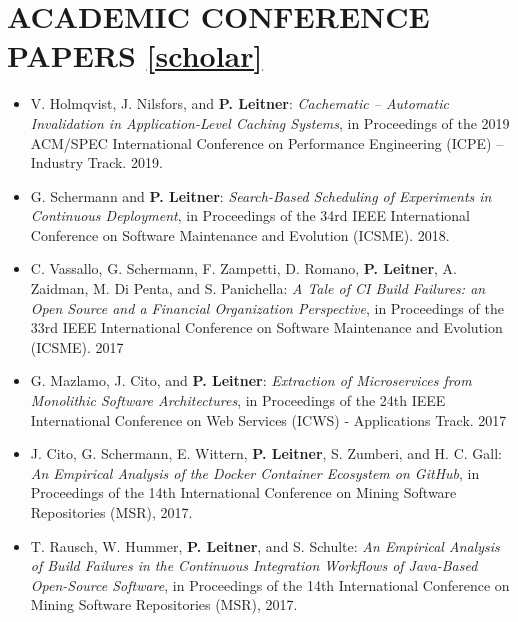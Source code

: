 \documentclass[paper=letter,fontsize=11pt]{scrartcl} %
\newcommand{\NewPart}[2]{\section*{\uppercase{#1} #2}}
\begin{document}
\NewPart{Academic Conference Papers}{\href{https://scholar.google.ch/citations?user=wZ9f8CAAAAAJ}{[scholar]}}

\begin{itemize}
	\item V. Holmqvist, J. Nilsfors, and \textbf{P. Leitner}: \emph{Cachematic -- Automatic Invalidation in Application-Level Caching Systems}, in Proceedings of the 2019 ACM/SPEC  International Conference on Performance Engineering (ICPE) -- Industry Track. 2019.
	\item G. Schermann and \textbf{P. Leitner}: \emph{Search-Based Scheduling of Experiments in Continuous Deployment}, in Proceedings of the 34rd IEEE International Conference on Software Maintenance and Evolution (ICSME). 2018.
	\item C. Vassallo, G. Schermann, F. Zampetti, D. Romano, \textbf{P. Leitner}, A. Zaidman, M. Di Penta, and S. Panichella: \emph{A Tale of CI Build Failures: an Open Source and a Financial Organization Perspective}, in Proceedings of the 33rd IEEE International Conference on Software Maintenance and Evolution (ICSME). 2017
	\item G. Mazlamo, J. Cito, and \textbf{P. Leitner}: \emph{Extraction of Microservices from Monolithic Software Architectures}, in Proceedings of the 24th IEEE International Conference on Web Services (ICWS) - Applications Track. 2017
	\item J. Cito, G. Schermann, E. Wittern, \textbf{P. Leitner}, S. Zumberi, and H. C. Gall: \emph{An Empirical Analysis of the Docker Container Ecosystem on GitHub}, in Proceedings of the 14th International Conference on Mining Software Repositories (MSR), 2017.
	\item T. Rausch, W. Hummer, \textbf{P. Leitner}, and S. Schulte: \emph{An Empirical Analysis of Build Failures in the Continuous Integration Workflows of Java-Based Open-Source Software}, in Proceedings of the 14th International Conference on Mining Software Repositories (MSR), 2017.

\end{itemize}
\end{document}
